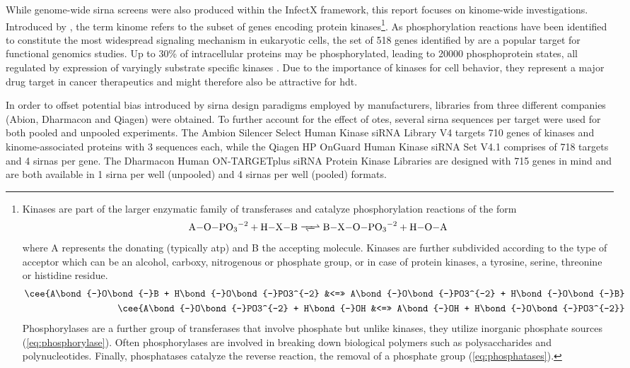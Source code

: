 While genome-wide \gls{sirna} screens were also produced within the InfectX framework, this report focuses on kinome-wide investigations. Introduced by \cite{Manning2002}, the term kinome refers to the subset of genes encoding protein kinases\footnote{Kinases are part of the larger enzymatic family of transferases and catalyze phosphorylation reactions of the form
\begin{equation}
  \ce{A\bond{-}O\bond{-}PO3^{-2} + H\bond{-}X\bond{-}B <=>> B\bond{-}X\bond{-}O\bond{-}PO3^{-2} + H\bond{-}O\bond{-}A} \label{eq:kinase}
\end{equation}
where A represents the donating (typically \gls{atp}) and B the accepting molecule. Kinases are further subdivided according to the type of acceptor which can be an alcohol, carboxy, nitrogenous or phosphate group, or in case of protein kinases, a tyrosine, serine, threonine or histidine residue.
\begin{align}
  \cee{A\bond{-}O\bond{-}B + H\bond{-}O\bond{-}PO3^{-2} &<=>> A\bond{-}O\bond{-}PO3^{-2} + H\bond{-}O\bond{-}B} \label{eq:phosphorylase} \\
  \cee{A\bond{-}O\bond{-}PO3^{-2} + H\bond{-}OH &<=>> A\bond{-}OH + H\bond{-}O\bond{-}PO3^{-2}} \label{eq:phosphatases}
\end{align}
Phosphorylases are a further group of transferases that involve phosphate but unlike kinases, they utilize inorganic phosphate sources (\ref{eq:phosphorylase}). Often phosphorylases are involved in breaking down biological polymers such as polysaccharides and polynucleotides. Finally, phosphatases catalyze the reverse reaction, the removal of a phosphate group (\ref{eq:phosphatases}).}. As phosphorylation reactions have been identified to constitute the most widespread signaling mechanism in eukaryotic cells, the set of 518 genes identified by \citeauthor{Manning2002} are a popular target for functional genomics studies. Up to 30\% of intracellular proteins may be phosphorylated, leading to 20000 phosphoprotein states, all regulated by expression of varyingly substrate specific kinases \citep{Johnson2005}. Due to the importance of kinases for cell behavior, they represent a major drug target in cancer therapeutics and might therefore also be attractive for \gls{hdt}.

In order to offset potential bias introduced by \gls{sirna} design paradigms employed by manufacturers, libraries from three different companies (Abion, Dharmacon and Qiagen) were obtained. To further account for the effect of \glspl{ote}, several \gls{sirna} sequences per target were used for both pooled and unpooled experiments. The Ambion Silencer Select Human Kinase siRNA Library V4 targets 710 genes of kinases and kinome-associated proteins with 3 sequences each, while the Qiagen HP OnGuard Human Kinase siRNA Set V4.1 comprises of 718 targets and 4 \glspl{sirna} per gene. The Dharmacon Human ON-TARGETplus siRNA Protein Kinase Libraries are designed with 715 genes in mind and are both available in 1 \gls{sirna} per well (unpooled) and 4 \glspl{sirna} per well (pooled) formats.

